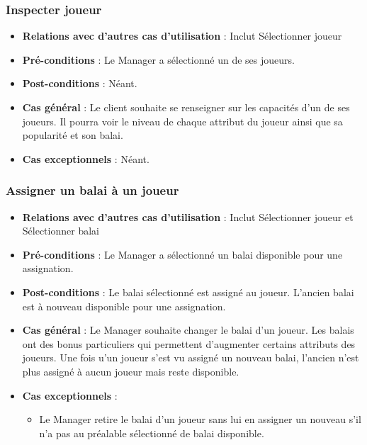 \documentclass[a4paper,titlepage]{scrreprt}
\begin{document}
    \subsubsection{Inspecter joueur}
      \begin{itemize}
        \item \textbf{Relations avec d'autres cas d'utilisation}  : Inclut Sélectionner joueur
        \item \textbf{Pré-conditions} : Le Manager a sélectionné un de ses joueurs.
        \item \textbf{Post-conditions} : Néant.
        \item \textbf{Cas général} : Le client souhaite se renseigner sur les capacités d’un de ses joueurs. Il pourra voir le niveau de chaque attribut du joueur ainsi que sa popularité et son balai.

        \item \textbf{Cas exceptionnels} : Néant.
      \end{itemize}
    \subsubsection{Assigner un balai à un joueur}
      \begin{itemize}
        \item \textbf{Relations avec d'autres cas d'utilisation}  : Inclut Sélectionner joueur et Sélectionner balai
        \item \textbf{Pré-conditions} : Le Manager a sélectionné un balai disponible pour une assignation.
        \item \textbf{Post-conditions} : Le balai sélectionné est assigné au joueur. L’ancien balai est à nouveau disponible pour une assignation.
        \item \textbf{Cas général} : Le Manager souhaite changer le balai d’un joueur. Les balais ont des bonus particuliers qui permettent d’augmenter certains attributs des joueurs. Une fois u'un joueur s'est vu assigné un nouveau balai, l'ancien n'est plus assigné à aucun joueur mais reste disponible.
        \item \textbf{Cas exceptionnels} :
          \begin{itemize}
            \item Le Manager retire le balai d’un joueur sans lui en assigner un nouveau s’il n'a pas au préalable sélectionné de balai disponible.
          \end{itemize}
      \end{itemize}
\end{document}
